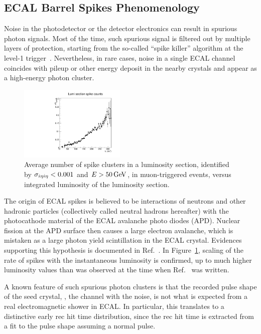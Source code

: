 \subsection{ECAL Barrel Spikes Phenomenology}
\label{sec:spikes}

Noise in the photodetector or the detector electronics can result in spurious photon signals. 
Most of the time, such spurious signal is filtered out by multiple layers of protection, starting from the so-called ``spike killer'' algorithm at the level-1 trigger~\cite{CMS_AN_2010-357}. 
Nevertheless, in rare cases, noise in a single ECAL channel coincides with pileup or other energy deposit in the nearby crystals and appear as a high-energy photon cluster.

\begin{figure}[tbp]
  \begin{center}
    \includegraphics[width=0.45\textwidth]{Reconstruction/Figures/spikes/spike_lumi_scaling.pdf}
    \caption{
      Average number of spike clusters in a luminosity section, identified by $\sigma_{i\eta i\eta} < 0.001$ and $E > 50\,\text{Ge\hspace{-.08em}V}$, in muon-triggered events, versus integrated luminosity of the luminosity section.
    }
    \label{fig:spike_lumi_scaling}
  \end{center}
\end{figure}

The origin of ECAL spikes is believed to be interactions of neutrons and other hadronic particles (collectively called neutral hadrons hereafter) with the photocathode material of the ECAL avalanche photo diodes (APD). 
Nuclear fission at the APD surface then causes a large electron avalanche, which is mistaken as a large photon yield scintillation in the ECAL crystal. 
Evidences supporting this hypothesis is documented in Ref.~\cite{CMS_AN_2010-357}. 
In Figure~\ref{fig:spike_lumi_scaling}, scaling of the rate of spikes with the instantaneous luminosity is confirmed, up to much higher luminosity values than was observed at the time when Ref.~\cite{CMS_AN_2010-357} was written.

A known feature of such spurious photon clusters is that the recorded pulse shape of the seed crystal, \ie, the channel with the noise, is not what is expected from a real electromagnetic shower in ECAL. 
In particular, this translates to a distinctive early rec hit time distribution, since the rec hit time is extracted from a fit to the pulse shape assuming a normal pulse.

